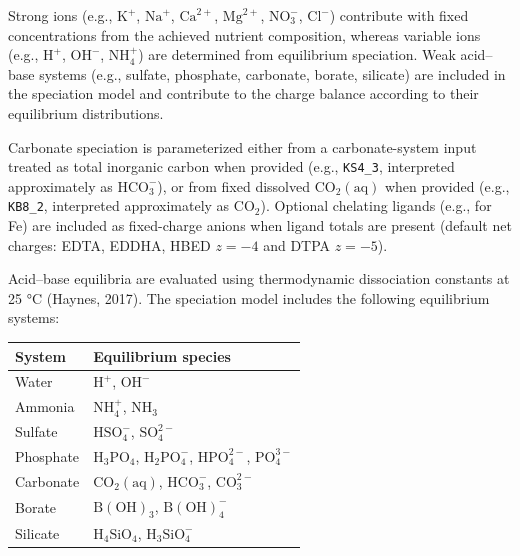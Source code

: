 \documentclass[
  letterpaper,
  DIV=11,
  numbers=noendperiod]{scrreprt}
\begin{document}
Strong ions (e.g., \(\mathrm{K}^+\), \(\mathrm{Na}^+\),
\(\mathrm{Ca}^{2+}\), \(\mathrm{Mg}^{2+}\), \(\mathrm{NO}_3^-\),
\(\mathrm{Cl}^-\)) contribute with fixed concentrations from the
achieved nutrient composition, whereas variable ions (e.g.,
\(\mathrm{H}^+\), \(\mathrm{OH}^-\), \(\mathrm{NH}_4^+\)) are determined
from equilibrium speciation. Weak acid--base systems (e.g., sulfate,
phosphate, carbonate, borate, silicate) are included in the speciation
model and contribute to the charge balance according to their
equilibrium distributions.

Carbonate speciation is parameterized either from a carbonate-system
input treated as total inorganic carbon when provided (e.g.,
\texttt{KS4\_3}, interpreted approximately as \(\mathrm{HCO}_3^-\)), or
from fixed dissolved \(\mathrm{CO}_2(\mathrm{aq})\) when provided (e.g.,
\texttt{KB8\_2}, interpreted approximately as \(\mathrm{CO}_2\)).
Optional chelating ligands (e.g., for Fe) are included as fixed-charge
anions when ligand totals are present (default net charges: EDTA, EDDHA,
HBED \(z=-4\) and DTPA \(z=-5\)).

Acid--base equilibria are evaluated using thermodynamic dissociation
constants at 25 °C (Haynes, 2017). The speciation model includes the
following equilibrium systems:

\begin{longtable}[]{@{}
  >{\raggedright\arraybackslash}p{}
  >{\raggedright\arraybackslash}p{}@{}}
\toprule\noalign{}
\begin{minipage}[b]{\linewidth}\raggedright
System
\end{minipage} & \begin{minipage}[b]{\linewidth}\raggedright
Equilibrium species
\end{minipage} \\
\midrule\noalign{}
\endhead
\bottomrule\noalign{}
\endlastfoot
Water & \(\mathrm{H}^+\), \(\mathrm{OH}^-\) \\
Ammonia & \(\mathrm{NH}_4^+\), \(\mathrm{NH}_3\) \\
Sulfate & \(\mathrm{HSO}_4^-\), \(\mathrm{SO}_4^{2-}\) \\
Phosphate & \(\mathrm{H}_3\mathrm{PO}_4\),
\(\mathrm{H}_2\mathrm{PO}_4^-\), \(\mathrm{HPO}_4^{2-}\),
\(\mathrm{PO}_4^{3-}\) \\
Carbonate & \(\mathrm{CO}_2(\mathrm{aq})\), \(\mathrm{HCO}_3^-\),
\(\mathrm{CO}_3^{2-}\) \\
Borate & \(\mathrm{B(OH)}_3\), \(\mathrm{B(OH)}_4^-\) \\
Silicate & \(\mathrm{H}_4\mathrm{SiO}_4\),
\(\mathrm{H}_3\mathrm{SiO}_4^-\) \\
\end{longtable}
\end{document}
